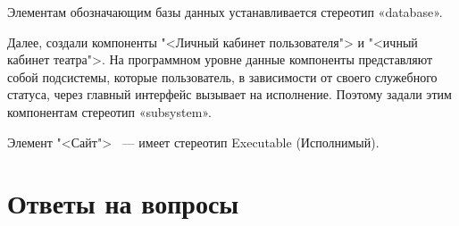 \clearpage

Элементам обозначающим базы данных устанавливается стереотип «database».\par
Далее, создали компоненты "<Личный кабинет пользователя"> и "<ичный кабинет театра">.
На программном уровне данные компоненты представляют собой
подсистемы, которые пользователь, в зависимости от своего служебного статуса,
через главный интерфейс вызывает на исполнение.
Поэтому задали этим компонентам стереотип «subsystem».\par
Элемент "<Сайт"> ~---
имеет стереотип Executable (Исполнимый).

\clearpage

\section*{Ответы на вопросы}

